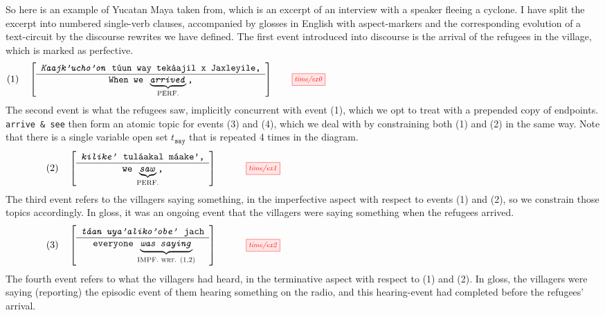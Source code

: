 \begin{example}
So here is an example of Yucatan Maya taken from\citep{nativlangMayaMayaHow2019}, which is an excerpt of an interview with a speaker fleeing a cyclone. I have split the excerpt into numbered single-verb clauses, accompanied by glosses in English with aspect-markers and the corresponding evolution of a text-circuit by the discourse rewrites we have defined. The first event introduced into discourse is the arrival of the refugees in the village, which is marked as perfective.
\[(1) \quad \left[ \begin{array}{c}\texttt{\emph{Kaajk'ucho'on} t\'{u}un way tek\`{a}ajil x Jaxleyile,} \\ \hline \texttt{When we }\underbrace{\texttt{\emph{arrived}}}_{\textsc{\makebox[0pt]{PERF.}}}\texttt{,}\end{array} \right] \vcenter{\scalebox{0.75}{\tikzfig{time/ex0}}}\]
The second event is what the refugees saw, implicitly concurrent with event (1), which we opt to treat with a prepended copy of endpoints. \texttt{arrive \& see} then form an atomic topic for events (3) and (4), which we deal with by constraining both (1) and (2) in the same way. Note that there is a single variable open set $t_\texttt{say}$ that is repeated 4 times in the diagram.
\[(2) \quad \left[ \begin{array}{c} \texttt{\emph{kilike'} tul\'{a}akal m\'{a}ake',} \\ \hline \texttt{we } \underbrace{\texttt{\emph{saw}}}_{\textsc{\makebox[0pt]{PERF.}}}\texttt{,} \end{array} \right] \quad \vcenter{\scalebox{0.75}{\tikzfig{time/ex1}}}\]
The third event refers to the villagers saying something, in the imperfective aspect with respect to events (1) and (2), so we constrain those topics accordingly. In gloss, it was an ongoing event that the villagers were saying something when the refugees arrived.
\[(3) \quad \left[ \begin{array}{c} \texttt{\emph{t\'{a}an uya'aliko'obe'} jach} \\ \hline \texttt{everyone }\underbrace{\texttt{\emph{was saying}}}_{\textsc{\makebox[0pt]{IMPF. wrt. (1,2)}}}\end{array} \right] \quad \vcenter{\scalebox{0.75}{\tikzfig{time/ex2}}}\]
The fourth event refers to what the villagers had heard, in the terminative aspect with respect to (1) and (2). In gloss, the villagers were saying (reporting) the episodic event of them hearing something on the radio, and this hearing-event had completed before the refugees' arrival.

\end{example}
